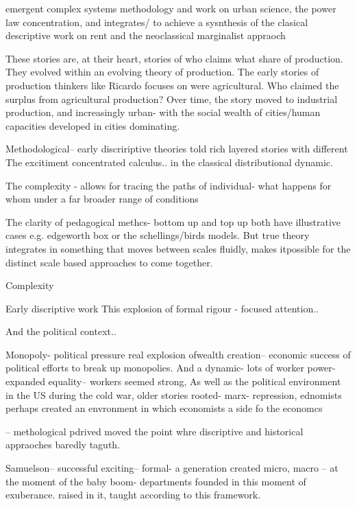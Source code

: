 emergent complex systems methodology and  work on urban science, the power law concentration, and integrates/ to achieve a sysnthesis of  the clasical descriptive work on rent and the neoclassical marginalist appraoch

These stories are, at their heart, stories of who claims what share of production. They evolved within an evolving theory of production. The early stories of production thinkers like Ricardo focuses on were agricultural. Who claimed the surplus from agricultural production? Over time, the story moved to industrial production, and increasingly urban- with the social wealth of cities/human capacities developed in cities dominating. %



Methodological-- early discririptive theories told rich layered stories with different
The excitiment concentrated  calculus.. in the classical distributional dynamic.

The complexity - allows for tracing the paths of individual- what happens for whom under a far broader range of conditions

The clarity of pedagogical methcs- bottom up and top up both have illustrative cases e.g. edgeworth box or the schellings/birds models.
But true theory integrates in something that moves between scales fluidly, makes itpossible for the distinct scale based approaches to come together.


Complexity

Early discriptive work
This explosion of formal rigour - focused attention.. 


And the political context..

Monopoly- political pressure real explosion ofwealth creation-- economic success of political efforts to break up monopolies.
And a dynamic- lots of worker power- expanded equality-- workers seemed strong, 
As well as the political environment in the US during the cold war, older stories rooted- marx- repression, ednomists perhaps created an envronment in which economists
a side fo the economcs

-- methological pdrived moved the point whre discriptive and historical appraoches baredly taguth.

Samuelson-- successful exciting-- formal-
a generation
created micro, macro
-- at the moment of the baby boom- departments founded in this moment of exuberance. raised in it, taught according to this framework.


